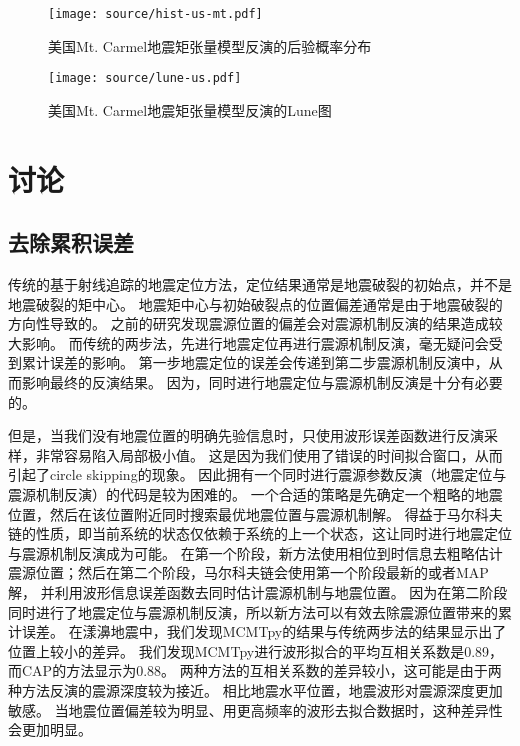 \begin{figure}[h]
    \centering
    \texttt{[image: source/hist-us-mt.pdf]}
    \caption{美国Mt. Carmel地震矩张量模型反演的后验概率分布}
    \label{fig:hist-us-mt}
\end{figure}



\begin{figure}[h]
    \centering
    \texttt{[image: source/lune-us.pdf]}
    \caption{美国Mt. Carmel地震矩张量模型反演的Lune图}
    \label{fig:lune-us}
\end{figure}

\section{讨论}

\subsection{去除累积误差}

传统的基于射线追踪的地震定位方法，定位结果通常是地震破裂的初始点，并不是地震破裂的矩中心。
地震矩中心与初始破裂点的位置偏差通常是由于地震破裂的方向性导致的\citep{Xu2019,Li2020}。
之前的研究\citep{Tan2018}发现震源位置的偏差会对震源机制反演的结果造成较大影响。
而传统的两步法，先进行地震定位再进行震源机制反演，毫无疑问会受到累计误差的影响。
第一步地震定位的误差会传递到第二步震源机制反演中，从而影响最终的反演结果。
因为，同时进行地震定位与震源机制反演是十分有必要的。

但是，当我们没有地震位置的明确先验信息时，只使用波形误差函数进行反演采样，非常容易陷入局部极小值。
这是因为我们使用了错误的时间拟合窗口，从而引起了circle skipping的现象。
因此拥有一个同时进行震源参数反演（地震定位与震源机制反演）的代码是较为困难的。
一个合适的策略是先确定一个粗略的地震位置，然后在该位置附近同时搜索最优地震位置与震源机制解。
得益于马尔科夫链的性质，即当前系统的状态仅依赖于系统的上一个状态，这让同时进行地震定位与震源机制反演成为可能。
在第一个阶段，新方法使用相位到时信息去粗略估计震源位置；然后在第二个阶段，马尔科夫链会使用第一个阶段最新的或者MAP解，
并利用波形信息误差函数去同时估计震源机制与地震位置。
因为在第二阶段同时进行了地震定位与震源机制反演，所以新方法可以有效去除震源位置带来的累计误差。
在漾濞地震中，我们发现MCMTpy的结果与传统两步法的结果显示出了位置上较小的差异。
我们发现MCMTpy进行波形拟合的平均互相关系数是0.89，而CAP的方法显示为0.88。
两种方法的互相关系数的差异较小，这可能是由于两种方法反演的震源深度较为接近。
相比地震水平位置，地震波形对震源深度更加敏感。
当地震位置偏差较为明显、用更高频率的波形去拟合数据时，这种差异性会更加明显。




